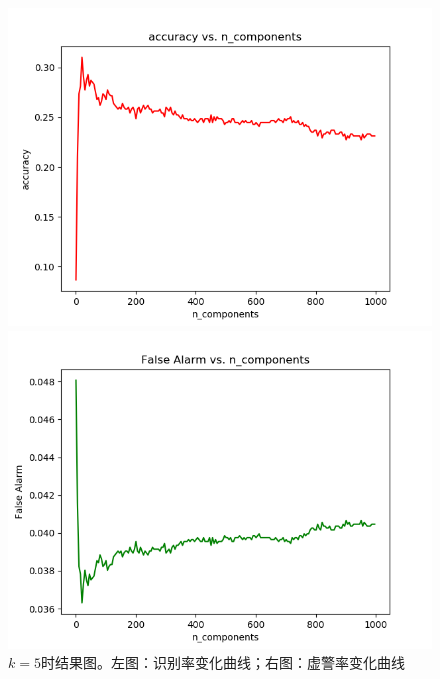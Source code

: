 \documentclass[cn]{elegantbook}
\begin{document}
\begin{figure}[!h]
	\centering
	\begin{minipage}[t]{0.48\textwidth}
		\centering
		\includegraphics[width=\textwidth]{../results/acc_n_5}
	\end{minipage}
	\begin{minipage}[t]{0.48\textwidth}
		\centering
		\includegraphics[width=\textwidth]{../results/falseAlarm_n_5}
	\end{minipage}
	\caption{\label{knn_res_3}$k=5$时结果图。左图：识别率变化曲线；右图：虚警率变化曲线}
\end{figure}
\end{document}
